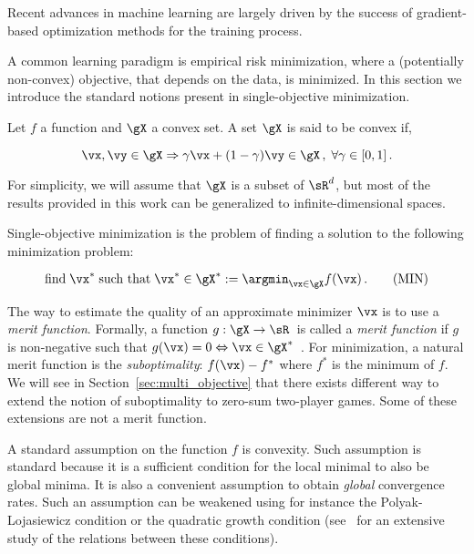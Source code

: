 Recent advances in machine learning are largely driven by the success of gradient-based optimization methods for the training process.

A common learning paradigm is empirical risk minimization, where a (potentially non-convex) objective, that depends on the data, is minimized. In this section we introduce the standard notions present in single-objective minimization.







Let $f$ a function and $\gX$ a convex set. A set $\gX$ is said to be convex if,

\begin{equation}
\vx, \vy \in \gX \Rightarrow \gamma \vx + (1- \gamma) \vy \in \gX \, , \; \forall \gamma \in [0,1]\,.
\end{equation}

For simplicity, we will assume that $\gX$ is a subset of $\sR^d$, but most of the results provided in this work can be generalized to infinite-dimensional spaces.

Single-objective minimization is the problem of finding a solution to the following minimization problem:

\begin{equation}
\text{find} \; \vx^* \; \text{such that} \; \vx^* \in \gX^* := \argmin_{\vx \in \gX} f(\vx) \,. \label{eq:minimization} \tag{MIN}
\end{equation}

The way to estimate the quality of an approximate minimizer $\vx$ is to use a \emph{merit function}. Formally, a function $g: \gX \to \sR\,$ is called a \emph{merit function} if $g$ is non-negative such that $g(\vx) = 0 \Leftrightarrow \vx \in \gX^*$~\citep{larsson1994class}. For minimization, a natural merit function is the \emph{suboptimality}: $f(\vx) - f^*$ where $f^*$ is the minimum of $f$. We will see in Section~\ref{sec:multi_objective} that there exists different way to extend the notion of suboptimality to zero-sum two-player games. Some of these extensions are not a merit function. 




A standard assumption on the function $f$ is convexity. Such assumption is standard because it is a sufficient condition for the local minimal to also be global minima. It is also a convenient assumption to obtain \emph{global} convergence rates. Such an assumption can be weakened using for instance the Polyak-Lojasiewicz condition or the quadratic growth condition (see~\citep{karimi2016linear} for an extensive study of the relations between these conditions). 

